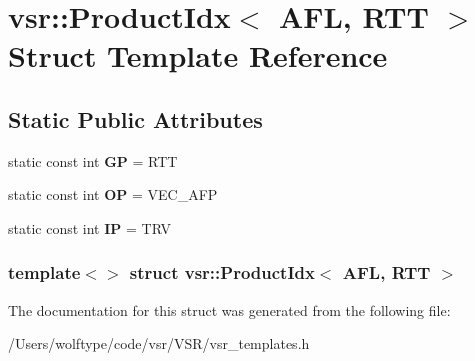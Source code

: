 \hypertarget{structvsr_1_1_product_idx_3_01_a_f_l_00_01_r_t_t_01_4}{\section{vsr\-:\-:Product\-Idx$<$ A\-F\-L, R\-T\-T $>$ Struct Template Reference}
\label{structvsr_1_1_product_idx_3_01_a_f_l_00_01_r_t_t_01_4}
}
\subsection*{Static Public Attributes}
\begin{DoxyCompactItemize}
\item 
\hypertarget{structvsr_1_1_product_idx_3_01_a_f_l_00_01_r_t_t_01_4_a86decf60d9d0bbd684b8a67ab09f307c}{static const int {\bfseries G\-P} = R\-T\-T}\label{structvsr_1_1_product_idx_3_01_a_f_l_00_01_r_t_t_01_4_a86decf60d9d0bbd684b8a67ab09f307c}

\item 
\hypertarget{structvsr_1_1_product_idx_3_01_a_f_l_00_01_r_t_t_01_4_a9b6ff64f59dd72c5546d69550009ed64}{static const int {\bfseries O\-P} = V\-E\-C\-\_\-\-A\-F\-P}\label{structvsr_1_1_product_idx_3_01_a_f_l_00_01_r_t_t_01_4_a9b6ff64f59dd72c5546d69550009ed64}

\item 
\hypertarget{structvsr_1_1_product_idx_3_01_a_f_l_00_01_r_t_t_01_4_af6b8fd72eb386df5163129e61500eb95}{static const int {\bfseries I\-P} = T\-R\-V}\label{structvsr_1_1_product_idx_3_01_a_f_l_00_01_r_t_t_01_4_af6b8fd72eb386df5163129e61500eb95}

\end{DoxyCompactItemize}
\subsubsection*{template$<$$>$ struct vsr\-::\-Product\-Idx$<$ A\-F\-L, R\-T\-T $>$}



The documentation for this struct was generated from the following file\-:\begin{DoxyCompactItemize}
\item 
/\-Users/wolftype/code/vsr/\-V\-S\-R/vsr\-\_\-templates.\-h\end{DoxyCompactItemize}
